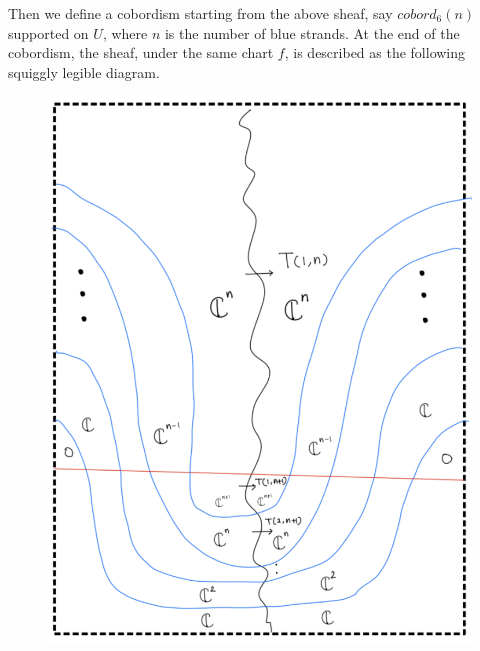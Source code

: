 Then we define a cobordism starting from the above sheaf, say $cobord_6(n)$ supported on $U$, where $n$ is the number of blue strands. At the end of the cobordism, the sheaf, under the same chart $f$, is described as the following squiggly legible diagram.
\begin{figure}[H]
    \centering
    \includegraphics[scale = 0.95]{diagrams/cobord6/7.png}
    \caption{}
    \label{fig:your-label}
\end{figure}

